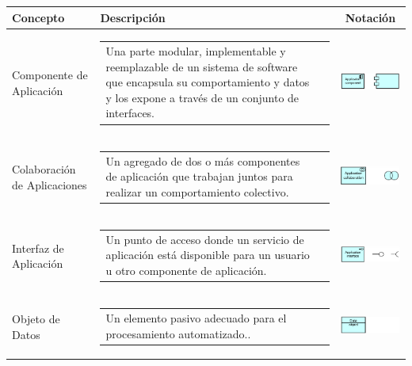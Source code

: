\begin{longtable}[c]{|p{2.5cm}|l|c|}

	\hline
	\textbf{Concepto} 			& \textbf{Descripción}                                                                                                                                            & \textbf{Notación} \\ \hline
	\endhead
	Componente de Aplicación	& \begin{tabular}[c]{p{7cm}@{}l@{}}Una parte modular, implementable y reemplazable de un sistema de software que encapsula su comportamiento y datos y los expone a través de un conjunto de interfaces.\end{tabular}                                                    & \includegraphics[width=35mm]{arquitectura/adm_lenguaje/imgs/application/ApplicationComponent}           \\ \hline
	Colaboración de Aplicaciones& \begin{tabular}[c]{p{7cm}@{}l@{}}Un agregado de dos o más componentes de aplicación que trabajan juntos para realizar un comportamiento colectivo.\end{tabular} & \includegraphics[width=35mm]{arquitectura/adm_lenguaje/imgs/application/ApplicationCollaboration}          \\ \hline
	Interfaz de Aplicación		& \begin{tabular}[c]{p{7cm}@{}l@{}}Un punto de acceso donde un servicio de aplicación está disponible para un usuario u otro componente de aplicación.\end{tabular} & \includegraphics[width=35mm]{arquitectura/adm_lenguaje/imgs/application/ApplicationInterface}          \\ \hline
	Objeto de Datos				& \begin{tabular}[c]{p{7cm}@{}l@{}}Un elemento pasivo adecuado para el procesamiento automatizado..\end{tabular} & \includegraphics[width=35mm]{arquitectura/adm_lenguaje/imgs/application/DataObject}          \\ \hline

\end{longtable}
